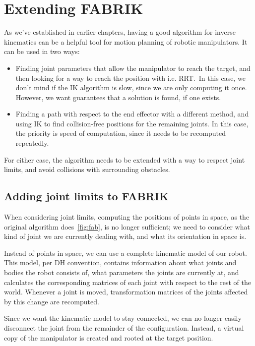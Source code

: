\chapter{Extending FABRIK}

As we've established in earlier chapters, having a good algorithm for inverse kinematics can be a helpful tool for motion planning of robotic manipulators. It can be used in two ways:

\begin{itemize}
  \item Finding joint parameters that allow the manipulator to reach the target, and then looking for a way to reach the position with i.e. RRT.\ In this case, we don't mind if the IK algorithm is slow, since we are only computing it once. However, we want guarantees that a solution is found, if one exists.
  \item Finding a path with respect to the end effector with a different method, and using IK to find collision-free positions for the remaining joints. In this case, the priority is speed of computation, since it needs to be recomputed repeatedly.
\end{itemize}

For either case, the algorithm needs to be extended with a way to respect joint limits, and avoid collisions with surrounding obstacles.

\section{Adding joint limits to FABRIK}

When considering joint limits, computing the positions of points in space, as the original algorithm does~\ref{fig:fab}, is no longer sufficient; we need to consider what kind of joint we are currently dealing with, and what its orientation in space is.

Instead of points in space, we can use a complete kinematic model of our robot. This model, per DH convention, contains information about what joints and bodies the robot consists of, what parameters the joints are currently at, and calculates the corresponding matrices of each joint with respect to the rest of the world. Whenever a joint is moved, transformation matrices of the joints affected by this change are recomputed.

Since we want the kinematic model to stay connected, we can no longer easily disconnect the joint from the remainder of the configuration. Instead, a virtual copy of the manipulator is created and rooted at the target position.

